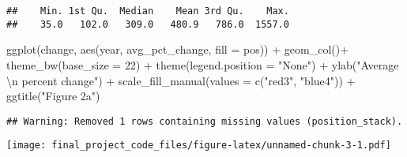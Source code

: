\documentclass[
]{article}
\newenvironment{Shaded}{\begin{snugshade}}{\end{snugshade}}
\newcommand{\AttributeTok}[1]{\textcolor[rgb]{0.77,0.63,0.00}{#1}}
\newcommand{\DecValTok}[1]{\textcolor[rgb]{0.00,0.00,0.81}{#1}}
\newcommand{\FunctionTok}[1]{\textcolor[rgb]{0.00,0.00,0.00}{#1}}
\newcommand{\NormalTok}[1]{#1}
\newcommand{\SpecialCharTok}[1]{\textcolor[rgb]{0.00,0.00,0.00}{#1}}
\newcommand{\StringTok}[1]{\textcolor[rgb]{0.31,0.60,0.02}{#1}}
\begin{document}
\begin{verbatim}
##    Min. 1st Qu.  Median    Mean 3rd Qu.    Max. 
##    35.0   102.0   309.0   480.9   786.0  1557.0
\end{verbatim}

\begin{Shaded}
\begin{Highlighting}[]
\FunctionTok{ggplot}\NormalTok{(change, }\FunctionTok{aes}\NormalTok{(year, avg\_pct\_change, }\AttributeTok{fill =}\NormalTok{ pos)) }\SpecialCharTok{+}
  \FunctionTok{geom\_col}\NormalTok{()}\SpecialCharTok{+}
  \FunctionTok{theme\_bw}\NormalTok{(}\AttributeTok{base\_size =} \DecValTok{22}\NormalTok{) }\SpecialCharTok{+}
  \FunctionTok{theme}\NormalTok{(}\AttributeTok{legend.position =} \StringTok{"None"}\NormalTok{) }\SpecialCharTok{+}
  \FunctionTok{ylab}\NormalTok{(}\StringTok{"Average }\SpecialCharTok{\textbackslash{}n}\StringTok{ percent change"}\NormalTok{) }\SpecialCharTok{+}
  \FunctionTok{scale\_fill\_manual}\NormalTok{(}\AttributeTok{values =} \FunctionTok{c}\NormalTok{(}\StringTok{"red3"}\NormalTok{, }\StringTok{"blue4"}\NormalTok{)) }\SpecialCharTok{+} \FunctionTok{ggtitle}\NormalTok{(}\StringTok{"Figure 2a"}\NormalTok{)}
\end{Highlighting}
\end{Shaded}

\begin{verbatim}
## Warning: Removed 1 rows containing missing values (position_stack).
\end{verbatim}

\texttt{[image: final\_project\_code\_files/figure-latex/unnamed-chunk-3-1.pdf]}
\end{document}
